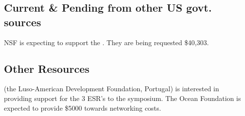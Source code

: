 \subsection{Current \& Pending from other US govt. sources}

NSF is expecting to support the \sympe. They are being requested
\$40,303. 

\subsection{Other Resources}

\fla (the Luso-American Development Foundation, Portugal) is
interested in providing support for the 3 ESR's to the symposium. The
Ocean Foundation is expected to provide \$5000 towards networking
costs.
